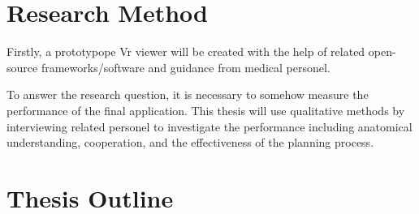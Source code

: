 \documentclass[11pt]{scrartcl}
\begin{document}
\section{Research Method}
    Firstly, a prototypope Vr viewer will be created with the help of related open-source frameworks/software and guidance from medical personel.
    
    To answer the research question, it is necessary to somehow measure the performance of the final application. This thesis will use qualitative methods by interviewing related personel to investigate the performance including anatomical understanding, cooperation, and the effectiveness of the planning process. 

\section{Thesis Outline}
\end{document}
